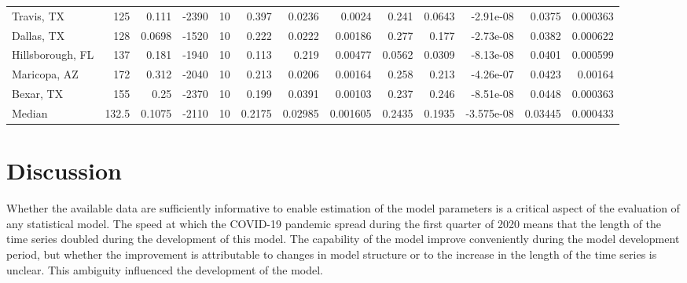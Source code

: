 \documentclass[12pt,letterpaper]{article}
\begin{document}
\begin{sidewaystable}
{\begin{tabular}{lrrrrrrrrrrrr}
 Travis, TX        & 125   &  0.111  & -2390 &    10 &          0.397  &          0.0236  &       0.0024   &       0.241  &     0.0643   &       -2.91e-08  &           0.0375  &        0.000363 \\
 Dallas, TX        & 128   &  0.0698 & -1520 &    10 &          0.222  &          0.0222  &       0.00186  &       0.277  &     0.177    &       -2.73e-08  &           0.0382  &        0.000622 \\
 Hillsborough, FL  & 137   &  0.181  & -1940 &    10 &          0.113  &          0.219   &       0.00477  &       0.0562 &     0.0309   &       -8.13e-08  &           0.0401  &        0.000599 \\
 Maricopa, AZ      & 172   &  0.312  & -2040 &    10 &          0.213  &          0.0206  &       0.00164  &       0.258  &     0.213    &       -4.26e-07  &           0.0423  &        0.00164  \\
 Bexar, TX         & 155   &  0.25   & -2370 &    10 &          0.199  &          0.0391  &       0.00103  &       0.237  &     0.246    &       -8.51e-08  &           0.0448  &        0.000363 \\
\hline
 Median            & 132.5 &  0.1075 & -2110 &    10 &          0.2175 &          0.02985 &       0.001605 &       0.2435 &     0.1935   &       -3.575e-08 &           0.03445 &        0.000433 \\
\hline
\end{tabular}

}\end{sidewaystable}

\clearpage
\section*{Discussion}

Whether the available data are sufficiently informative to enable
estimation of the model parameters is a critical aspect of the
evaluation of any statistical model.
The speed at which the COVID-19 pandemic spread during the first
quarter of
2020 means that the length of the time series doubled during
the development of this model. The capability of the
model improve conveniently during the model development period,
but whether the improvement is
attributable to changes in model structure or to the increase in the
length of the time series is unclear. This ambiguity influenced the
development of the model.

\cite{Sibert2017,Nielsen2014b,Chen2020}

\clearpage
\printbibliography[title=References]
\end{document}
